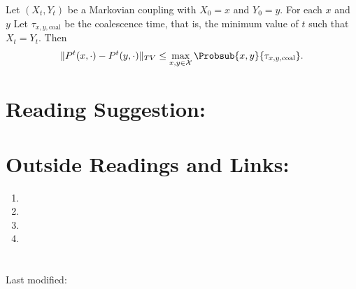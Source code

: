 \documentclass[12pt]{article}
\begin{document}
\begin{exercise}
    Let \( (X_t, Y_t) \) be a Markovian coupling with \( X_0 = x \) and \(
    Y_0 = y \).  For each \( x \) and \( y \) Let \( \tau_{x,y,\text{coal}}
    \) be the coalescence time, that is, the minimum value of \( t \)
    such that \( X_t = Y_t \).  Then
    \[
        \| P^t(x,\cdot) - P^t(y,\cdot)\|_{TV} \le \max_{x,y \in \mathcal
        {X}} \Probsub{x,y}{\tau_{x,y,\text{coal}}}.
    \]
\end{exercise}
\begin{solution}

\end{solution}

\hr

\section*{Reading Suggestion:}




\hr

\section*{Outside Readings and Links:}
\begin{enumerate}
    \item
    \item
    \item
    \item
\end{enumerate}

\section*{\solutionsname} \loadSolutions

\hr

\mydisclaim \myfooter

Last modified:  \flastmod
\end{document}
